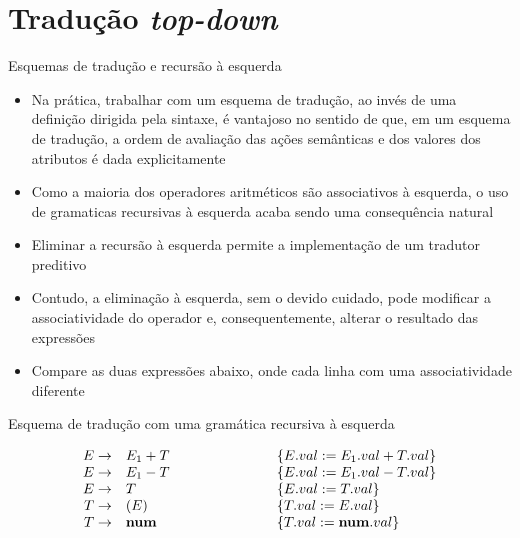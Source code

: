 \section{Tradução {\it top-down}}

\begin{frame}[fragile]{Esquemas de tradução e recursão à esquerda}

    \begin{itemize}
        \item Na prática, trabalhar com um esquema de tradução, ao invés de uma definição dirigida pela sintaxe, é vantajoso no sentido de que, em um esquema
            de tradução, a ordem de avaliação das ações semânticas e dos valores dos atributos é dada explicitamente

        \item Como a maioria dos operadores aritméticos são associativos à esquerda, o uso de gramaticas recursivas à esquerda acaba sendo uma consequência
            natural

        \item Eliminar a recursão à esquerda permite a implementação de um tradutor preditivo

        \item Contudo, a eliminação à esquerda, sem o devido cuidado, pode modificar a associatividade do operador e, consequentemente, alterar o resultado das 
        expressões

        \item Compare as duas expressões abaixo, onde cada linha com uma associatividade diferente
    \end{itemize}

\end{frame}

\begin{frame}[fragile]{Esquema de tradução com uma gramática recursiva à esquerda}

\[
    \begin{array}{rlp{2cm}l}
        E \to& E_1 + T & & \{E.val := E_1.val + T.val\} \\
        E \to& E_1 - T & & \{E.val := E_1.val - T.val\} \\
        E \to& T & & \{E.val := T.val\} \\
        T \to& (E) & & \{T.val := E.val\} \\
        T \to& \textbf{num} & & \{T.val := \textbf{num}.val\}
    \end{array}
\]

\end{frame}

